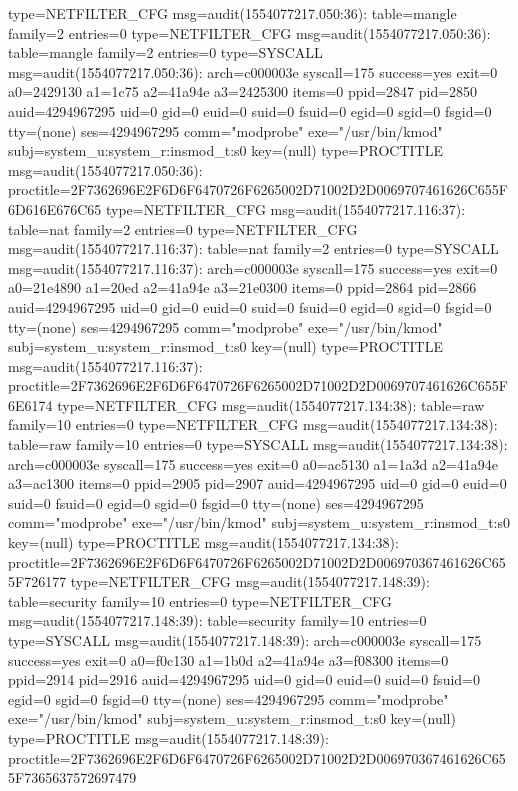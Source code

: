 \documentclass[]{report}
\newenvironment{Shaded}{}{}
\newcommand{\NormalTok}[1]{#1}
\begin{document}
\begin{Shaded}
\begin{Highlighting}[]
\NormalTok{type=NETFILTER_CFG msg=audit(1554077217.050:36): table=mangle family=2 entries=0}
\NormalTok{type=NETFILTER_CFG msg=audit(1554077217.050:36): table=mangle family=2 entries=0}
\NormalTok{type=SYSCALL msg=audit(1554077217.050:36): arch=c000003e syscall=175 success=yes exit=0 a0=2429130 a1=1c75 a2=41a94e a3=2425300 items=0 ppid=2847 pid=2850 auid=4294967295 uid=0 gid=0 euid=0 suid=0 fsuid=0 egid=0 sgid=0 fsgid=0 tty=(none) ses=4294967295 comm="modprobe" exe="/usr/bin/kmod" subj=system_u:system_r:insmod_t:s0 key=(null)}
\NormalTok{type=PROCTITLE msg=audit(1554077217.050:36): proctitle=2F7362696E2F6D6F6470726F6265002D71002D2D0069707461626C655F6D616E676C65}
\NormalTok{type=NETFILTER_CFG msg=audit(1554077217.116:37): table=nat family=2 entries=0}
\NormalTok{type=NETFILTER_CFG msg=audit(1554077217.116:37): table=nat family=2 entries=0}
\NormalTok{type=SYSCALL msg=audit(1554077217.116:37): arch=c000003e syscall=175 success=yes exit=0 a0=21e4890 a1=20ed a2=41a94e a3=21e0300 items=0 ppid=2864 pid=2866 auid=4294967295 uid=0 gid=0 euid=0 suid=0 fsuid=0 egid=0 sgid=0 fsgid=0 tty=(none) ses=4294967295 comm="modprobe" exe="/usr/bin/kmod" subj=system_u:system_r:insmod_t:s0 key=(null)}
\NormalTok{type=PROCTITLE msg=audit(1554077217.116:37): proctitle=2F7362696E2F6D6F6470726F6265002D71002D2D0069707461626C655F6E6174}
\NormalTok{type=NETFILTER_CFG msg=audit(1554077217.134:38): table=raw family=10 entries=0}
\NormalTok{type=NETFILTER_CFG msg=audit(1554077217.134:38): table=raw family=10 entries=0}
\NormalTok{type=SYSCALL msg=audit(1554077217.134:38): arch=c000003e syscall=175 success=yes exit=0 a0=ac5130 a1=1a3d a2=41a94e a3=ac1300 items=0 ppid=2905 pid=2907 auid=4294967295 uid=0 gid=0 euid=0 suid=0 fsuid=0 egid=0 sgid=0 fsgid=0 tty=(none) ses=4294967295 comm="modprobe" exe="/usr/bin/kmod" subj=system_u:system_r:insmod_t:s0 key=(null)}
\NormalTok{type=PROCTITLE msg=audit(1554077217.134:38): proctitle=2F7362696E2F6D6F6470726F6265002D71002D2D006970367461626C655F726177}
\NormalTok{type=NETFILTER_CFG msg=audit(1554077217.148:39): table=security family=10 entries=0}
\NormalTok{type=NETFILTER_CFG msg=audit(1554077217.148:39): table=security family=10 entries=0}
\NormalTok{type=SYSCALL msg=audit(1554077217.148:39): arch=c000003e syscall=175 success=yes exit=0 a0=f0c130 a1=1b0d a2=41a94e a3=f08300 items=0 ppid=2914 pid=2916 auid=4294967295 uid=0 gid=0 euid=0 suid=0 fsuid=0 egid=0 sgid=0 fsgid=0 tty=(none) ses=4294967295 comm="modprobe" exe="/usr/bin/kmod" subj=system_u:system_r:insmod_t:s0 key=(null)}
\NormalTok{type=PROCTITLE msg=audit(1554077217.148:39): proctitle=2F7362696E2F6D6F6470726F6265002D71002D2D006970367461626C655F7365637572697479}

\end{Highlighting}
\end{Shaded}
\end{document}
